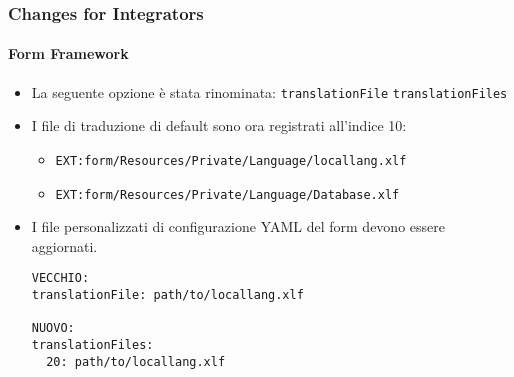 \begin{frame}[fragile]
	\frametitle{Changes for Integrators}
	\framesubtitle{Form Framework}

	\lstset{basicstyle=\tiny\ttfamily}

	\begin{itemize}
		\item La seguente opzione è stata rinominata:\newline
			\small\texttt{translationFile} \textrightarrow\hspace{0.1cm}\texttt{translationFiles}\normalsize
		\item I file di traduzione di default sono ora registrati all'indice 10:

			\begin{itemize}
				\item \texttt{EXT:form/Resources/Private/Language/locallang.xlf}
				\item \texttt{EXT:form/Resources/Private/Language/Database.xlf}
			\end{itemize}

		\item I file personalizzati di configurazione YAML del form devono essere aggiornati.

\begin{lstlisting}
VECCHIO:
translationFile: path/to/locallang.xlf

NUOVO:
translationFiles:
  20: path/to/locallang.xlf
\end{lstlisting}

	\end{itemize}

\end{frame}


